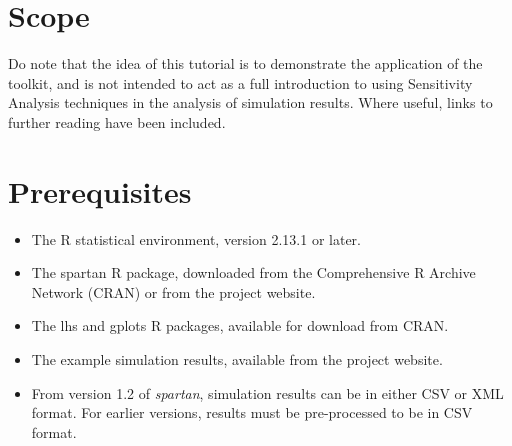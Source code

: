 \documentclass[a4paper,11pt]{article}
\begin{document}
\section{Scope}
\noindent Do note that the idea of this tutorial is to demonstrate the application of the toolkit, and is not intended to act as a full introduction to using Sensitivity Analysis techniques in the analysis of simulation results. Where useful, links to further reading have been included.

\section{Prerequisites}
\begin{itemize}
\item The R statistical environment, version 2.13.1 or later.
\item The spartan R package, downloaded from the Comprehensive R Archive Network (CRAN) or from the project website.
\item The lhs and gplots R packages, available for download from CRAN.
\item The example simulation results, available from the project website.
\item From version 1.2 of \textit{spartan}, simulation results can be in either CSV or XML format. For earlier versions, results must be pre-processed to be in CSV format.
\end{itemize}
\end{document}
